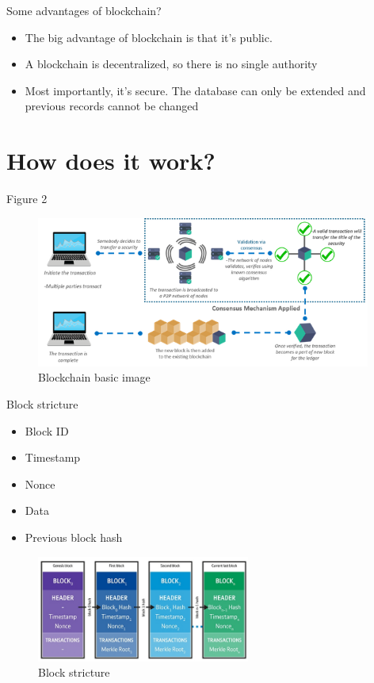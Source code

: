 \documentclass[10pt]{beamer}
\begin{document}
{
\begin{frame}{Some advantages of blockchain?}
\begin{itemize}

\item The big advantage of blockchain is that it's
public.
\item A blockchain is decentralized, so there is no
single authority
\item Most importantly, it's secure. The database
can only be extended and previous records
cannot be changed

\end{itemize}
\end{frame}
}

\section{How does it work?}

\begin{frame}[fragile]{Figure 2}
  \begin{figure}  
	\includegraphics[width=11cm]{main-chain}    
    \caption{Blockchain basic image}  %
\end{figure}
\end{frame}

\begin{frame}{Block stricture}

  \begin{itemize}
    \item Block ID
    \item Timestamp
    \item Nonce
    \item Data
    \item Previous block hash
   \end{itemize}
     \begin{figure}  
	\includegraphics[width=7cm]{blockchain-diagrams-02}    
    \caption{Block stricture}  %
\end{figure}
\end{frame}
\end{document}

